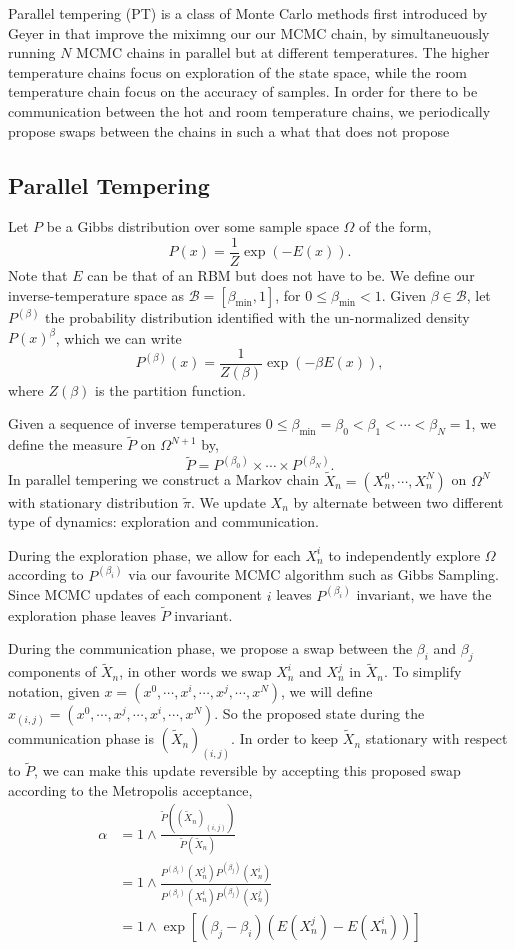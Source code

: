 \documentclass[12pt]{article}
\begin{document}
Parallel tempering (PT) is a class of Monte Carlo methods first introduced by Geyer in \cite{geyer1991markov} that improve the miximng our our MCMC chain, by simultaneuously running $N$ MCMC chains in parallel but at different temperatures. The higher temperature chains focus on exploration of the state space, while the room temperature chain focus on the accuracy of samples. In order for there to be communication between the hot and room temperature chains, we periodically propose swaps between the chains in such a what that does not propose 


\subsection{Parallel Tempering}
Let $P$ be a Gibbs distribution over some sample space $\Omega$ of the form,
\[P(x)=\frac{1}{Z} \exp(-E(x)).\]
Note that $E$ can be that of an RBM but does not have to be. We define our inverse-temperature space as $\mathcal{B}=[\beta_{\min},1]$, for $0\leq \beta_{\min}<1$. Given $\beta\in\mathcal{B}$, let $P^{(\beta)}$ the probability distribution identified with the un-normalized density $P(x)^\beta$, which we can write
\[P^{(\beta)}(x)= \frac{1}{Z(\beta)} \exp(-\beta E(x)),\]
where $Z(\beta)$ is the partition function. 

Given a sequence of inverse temperatures $0\leq\beta_{\min}= \beta_0<\beta_{1}<\cdots<\beta_N=1$, we define the measure $\tilde{P}$ on $\Omega^{N+1}$ by,
\[\tilde{P}=P^{(\beta_0)}\times\cdots\times P^{(\beta_N)}.\]
In parallel tempering we construct a Markov chain $\tilde{X}_n=(X_n^{0},\cdots, X^{N}_n)$ on $\Omega^N$ with stationary distribution $\tilde{\pi}$. We update $X_n$ by alternate between two different type of dynamics: exploration and communication. 

During the exploration phase, we allow for each $X_n^i$ to independently explore $\Omega$ according to $P^{(\beta_i)}$ via our favourite MCMC algorithm such as Gibbs Sampling. Since MCMC updates of each component $i$ leaves $P^{(\beta_i)}$ invariant, we have the exploration phase leaves $\tilde{P}$ invariant.

During the communication phase, we propose a swap between the $\beta_i$ and $\beta_j$ components of $\tilde{X}_n$, in other words we swap $X^i_n$ and $X^j_n$ in $\tilde{X}_n$. To simplify notation, given $x=(x^0,\cdots,x^i,\cdots,x^j,\cdots, x^N)$, we will define $x_{(i,j)}=(x^0,\cdots,x^j,\cdots,x^i,\cdots,x^N)$. So the proposed state during the communication phase is $(\tilde{X}_n)_{(i,j)}$. In order to keep $\tilde{X}_n$ stationary with respect to $\tilde{P}$, we can make this update reversible by accepting this proposed swap according to the Metropolis acceptance,
\begin{align*}
\alpha
&=1\wedge\frac{\tilde{P}((\tilde{X}_n)_{(i,j)})}{\tilde{P}(\tilde{X}_n)}\\
&=1\wedge\frac{P^{(\beta_i)}(X_n^j)P^{(\beta_j)}(X_n^i)}{P^{(\beta_i)}(X_n^i)P^{(\beta_j)}(X_n^j)}\\
&=1\wedge\exp\left[(\beta_j-\beta_i)(E(X_n^j)-E(X_n^i))\right]
\end{align*}
\end{document}
